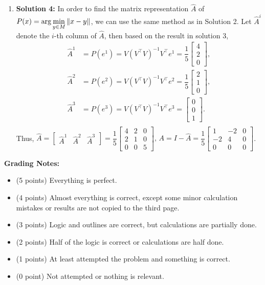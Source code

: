 \documentclass[letterpaper]{article}
\begin{document}
\begin{enumerate}
    \item[] \textbf{Solution 4:} In order to find the matrix representation $\hat{A}$ of $\displaystyle P(x)=\arg\min_{y\in M}\|x-y\|$, we can use the same method as in Solution 2. Let $\hat{A}^{i}$ denote the $i$-th column of $\hat{A}$, then based on the result in solution 3,
    \begin{equation*}
      \begin{split}
        \hat{A}^{1} & = P(e^{1})=V(V^\top V)^{-1}V^\top e^{1}=\dfrac{1}{5}\begin{bmatrix}4 \\ 2\\ 0 \end{bmatrix},\\
        \hat{A}^{2} & = P(e^{2})=V(V^\top V)^{-1}V^\top e^{2}=\dfrac{1}{5}\begin{bmatrix} 2\\ 1 \\ 0 \end{bmatrix},\\
        \hat{A}^{3} & = P(e^{3})=V(V^\top V)^{-1}V^\top e^{3}=\begin{bmatrix}0 \\ 0\\ 1 \end{bmatrix}.\\
      \end{split}
    \end{equation*}
    Thus,
    $\hat{A}=\begin{bmatrix}\hat{A}^{1} &\hat{A}^{2} &\hat{A}^{3} \end{bmatrix}=\dfrac{1}{5}\begin{bmatrix}4 &2& 0\\ 2 & 1 & 0\\ 0 & 0 & 5\end{bmatrix},\,
    A=I-\hat{A}=\dfrac{1}{5}\begin{bmatrix}1 &-2& 0\\ -2 & 4 & 0\\ 0 & 0 & 0\end{bmatrix}$.
\end{enumerate}

\noindent \textbf{Grading Notes:}
\begin{itemize}
  \item (5 points) Everything is perfect.
  \item (4 points) Almost everything is correct, except some minor calculation mistakes or results are not copied to the third page.
  \item (3 points) Logic and outlines are correct, but calculations are partially done.
  \item (2 points) Half of the logic is correct or calculations are half done.
  \item (1 points) At least attempted the problem and something is correct.
  \item (0 point) Not attempted or nothing is relevant.
\end{itemize}
\end{document}
